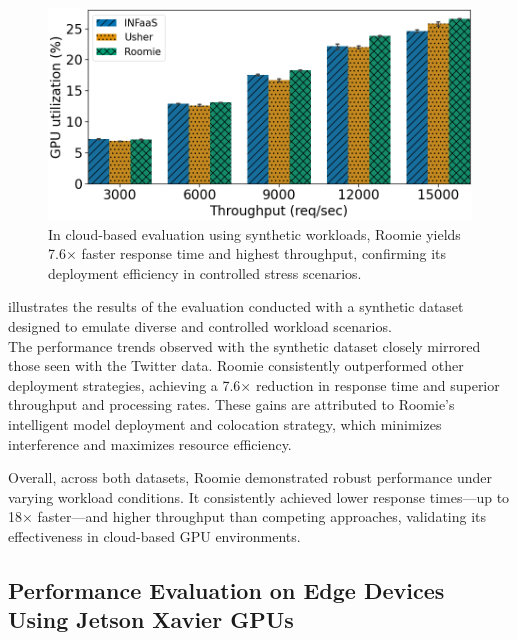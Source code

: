 \begin{figure}
\begin{minipage}[t]{.24\textwidth}
	\end{minipage}
	\hfill
	\begin{minipage}[t]{.24\textwidth}
		\centering
		\includegraphics[width=\textwidth]{chapters/roomie/images/NvidiaA100/synthetic-all-models/gpu_utilization.png}
	\end{minipage}
	\caption{In cloud-based evaluation using synthetic workloads, Roomie yields 7.6× faster response time and highest throughput, confirming its deployment efficiency in controlled stress scenarios.}
	\label{fig:NvidiaA100/synthetic-all-models}
	\vspace{-3mm}
\end{figure}


 illustrates the results of the evaluation conducted with a synthetic dataset designed to emulate diverse and controlled workload scenarios.\\
The performance trends observed with the synthetic dataset closely mirrored those seen with the Twitter data. Roomie consistently outperformed other deployment strategies, achieving a 7.6× reduction in response time and superior throughput and processing rates. These gains are attributed to Roomie's intelligent model deployment and colocation strategy, which minimizes interference and maximizes resource efficiency.

Overall, across both datasets, Roomie demonstrated robust performance under varying workload conditions. It consistently achieved lower response times—up to 18× faster—and higher throughput than competing approaches, validating its effectiveness in cloud-based GPU environments.



\subsection{Performance Evaluation on Edge Devices Using Jetson Xavier GPUs}

